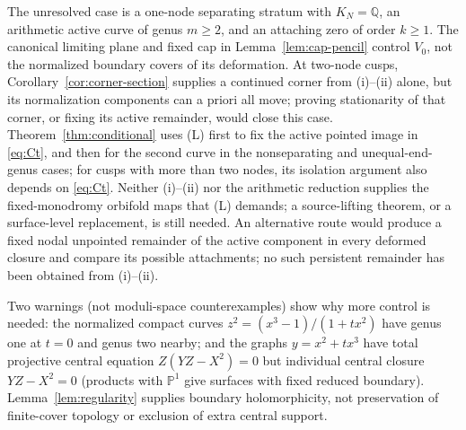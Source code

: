 \documentclass[12pt]{article}
\theoremstyle{remark}
\begin{document}
The unresolved case is a one-node separating stratum with
\(K_N=\mathbb Q\), an arithmetic active curve of genus \(m\ge2\),
and an attaching zero of order \(k\ge1\).
The canonical limiting plane and fixed cap in
Lemma~\ref{lem:cap-pencil} control \(V_0\), not the normalized
boundary covers of its deformation. At two-node cusps,
Corollary~\ref{cor:corner-section} supplies a continued
corner from (i)--(ii) alone, but its normalization components
can a priori all move; proving stationarity of that corner,
or fixing its active remainder, would close this case.
Theorem~\ref{thm:conditional} uses (L) first to fix the active
pointed image in \eqref{eq:Ct}, and then for the second curve
in the nonseparating and unequal-end-genus cases; for cusps with
more than two nodes, its isolation argument also depends on
\eqref{eq:Ct}. Neither (i)--(ii) nor the arithmetic reduction
supplies the fixed-monodromy orbifold maps that (L) demands; a
source-lifting theorem, or a surface-level replacement, is still
needed. An alternative route would produce a fixed nodal unpointed remainder
of the active component in every deformed closure and compare its
possible attachments; no such persistent remainder has been
obtained from (i)--(ii).

Two warnings (not moduli-space counterexamples) show why more
control is needed: the normalized compact curves
\(z^2=(x^3-1)/(1+tx^2)\) have genus one at \(t=0\) and genus two
nearby; and the graphs \(y=x^2+tx^3\) have total projective central
equation \(Z(YZ-X^2)=0\) but individual central closure
\(YZ-X^2=0\) (products with \(\mathbb P^1\) give surfaces with fixed
reduced boundary). Lemma~\ref{lem:regularity} supplies boundary
holomorphicity, not preservation of finite-cover topology or
exclusion of extra central support.
\end{document}
